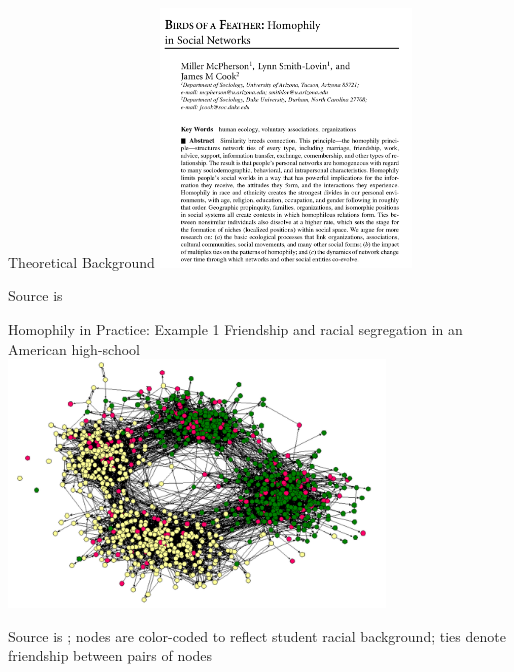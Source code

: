 \documentclass[notes, aspectratio=1610]{beamer}
\begin{document}
\begin{frame}{Theoretical Background}{}
	\centering
	\includegraphics[width=0.5\textwidth]{images/mcpherson_et_al.png}

	\small
	Source is \cite{mcpherson2001}
\end{frame}

\begin{frame}{Homophily in Practice: Example 1}
	{Friendship and racial segregation in an American high-school}
	\centering 
	\includegraphics[width=0.75\textwidth]{images/moody_2001.png}

	\raggedright
	\small
	Source is \cite{moody_2001}; nodes are color-coded to reflect 
	student racial background; ties denote friendship between pairs 
	of nodes
\end{frame}
\end{document}
